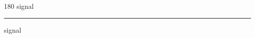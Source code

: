 
\begin{frame}
\begin{center}
\begin{turn}{180}
{\fontsize{2.5cm}{1em}\selectfont signal}
\end{turn}
\vspace{1em}\par  
\hrule
\vspace{1em}\par  
{\fontsize{2.5cm}{1em}\selectfont signal}
\end{center}
\end{frame}
